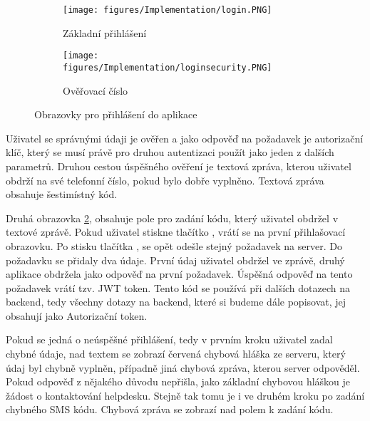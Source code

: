 \documentclass[11pt,twoside,a4paper]{book}
\begin{document}
\begin{figure}[ht]
	\centering
	\begin{subfigure}{.4\textwidth}
	  	\centering
	  	\texttt{[image: figures/Implementation/login.PNG]}
	  	\caption{Základní přihlášení}
	  	\label{fig:loginscreensImplementa}
	\end{subfigure}
	\begin{subfigure}{.4\textwidth}
	  	\centering
		\texttt{[image: figures/Implementation/loginsecurity.PNG]}
	  	\caption{Ověřovací číslo}
	  	\label{fig:loginscreensImplementb}
	\end{subfigure}
\caption{Obrazovky pro přihlášení do aplikace}
\label{fig:loginscreensImplement}
\end{figure}

Uživatel se správnými údaji je ověřen a jako odpověď na požadavek je autorizační klíč, který se musí právě pro druhou autentizaci použít jako jeden z dalších parametrů. Druhou cestou úspěšného ověření je textová zpráva, kterou uživatel obdrží na své telefonní číslo, pokud bylo dobře vyplněno. Textová zpráva obsahuje šestimístný kód.

Druhá obrazovka \ref{fig:loginscreensImplementb}, obsahuje pole pro zadání kódu, který uživatel obdržel v textové zprávě. Pokud uživatel stiskne tlačítko , vrátí se na první přihlašovací obrazovku. Po stisku tlačítka , se opět odešle stejný požadavek na server. Do požadavku se přidaly dva údaje. První údaj uživatel obdržel ve zprávě, druhý aplikace obdržela jako odpověď na první požadavek. Úspěšná odpověď na tento požadavek vrátí tzv.  JWT token. Tento kód se používá při dalších dotazech na backend, tedy všechny dotazy na backend, které si budeme dále popisovat, jej obsahují jako Autorizační token.

Pokud se jedná o neúspěšné přihlášení, tedy v prvním kroku uživatel zadal chybné údaje, nad textem se zobrazí červená chybová hláška ze serveru, který údaj byl chybně vyplněn, případně jiná chybová zpráva, kterou server odpověděl. Pokud odpověď z nějakého důvodu nepřišla, jako základní chybovou hláškou je žádost o kontaktování helpdesku. Stejně tak tomu je i ve druhém kroku po zadání chybného SMS kódu. Chybová zpráva se zobrazí nad polem k zadání kódu.
\end{document}
